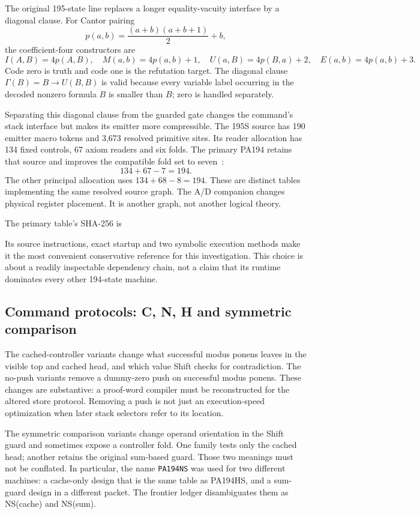 \documentclass[11pt,letterpaper]{article}
\begin{document}
The original 195-state line replaces a longer equality-vacuity interface
by a diagonal clause. For Cantor pairing
\[
 p(a,b)=\frac{(a+b)(a+b+1)}2+b,
\]
the coefficient-four constructors are
\[
 I(A,B)=4p(A,B),\quad M(a,b)=4p(a,b)+1,\quad
 U(a,B)=4p(B,a)+2,\quad E(a,b)=4p(a,b)+3.
 \tag{2}
\]
Code zero is truth and code one is the refutation target. The diagonal
clause $\Gamma(B)=B\to U(B,B)$ is valid because every variable label
occurring in the decoded nonzero formula $B$ is smaller than $B$; zero
is handled separately.

Separating this diagonal clause from the guarded gate changes the command's
stack interface but makes its emitter more compressible. The 195S source
has 190 emitter macro tokens and 3,673 resolved primitive sites. Its
reader allocation has 134 fixed controls, 67 axiom readers and six folds.
The primary PA194 retains that source and improves the compatible fold
set to seven~\cite{primary}:
\[
                134+67-7=194.
\]
The other principal allocation uses $134+68-8=194$. These are distinct
tables implementing the same resolved source graph. The A/D companion
changes physical register placement. It is another graph, not another
logical theory.

The primary table's SHA-256 is
\begin{center}\small{}\end{center}
Its source instructions, exact startup and two symbolic execution methods
make it the most convenient conservative reference for this investigation.
This choice is about a readily inspectable dependency chain, not a claim
that its runtime dominates every other 194-state machine.

\subsection{Command protocols: C, N, H and symmetric comparison}

The cached-controller variants change what successful modus ponens leaves
in the visible top and cached head, and which value Shift checks for
contradiction. The no-push variants remove a dummy-zero push on successful
modus ponens. These changes are substantive: a proof-word compiler must
be reconstructed for the altered store protocol. Removing a push is not
just an execution-speed optimization when later stack selectors refer
to its location.

The symmetric comparison variants change operand orientation in the
Shift guard and sometimes expose a controller fold. One family tests
only the cached head; another retains the original sum-based guard.
Those two meanings must not be conflated. In particular, the name
\texttt{PA194NS} was used for two different machines: a cache-only design
that is the same table as PA194HS, and a sum-guard design in a different
packet. The frontier ledger disambiguates them as NS(cache) and NS(sum).
\end{document}
